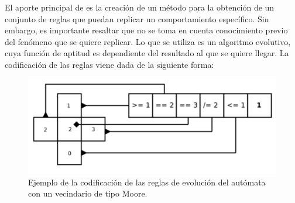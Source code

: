 El aporte principal de \cite{bidlo2016routine} es la creación de un método para la obtención de un conjunto de reglas que puedan replicar un comportamiento específico. Sin embargo, es importante resaltar que no se toma en cuenta conocimiento previo del fenómeno que se quiere replicar. Lo que se utiliza es un algoritmo evolutivo, cuya función de aptitud es dependiente del resultado al que se quiere llegar. La codificación de las reglas viene dada de la siguiente forma:

\begin{figure}[H]
	\centering
	\includegraphics[width=\linewidth]{fig/rulesencoding}
	\caption{Ejemplo de la codificación de las reglas de evolución del autómata con un vecindario de tipo Moore.}
	\label{fig:rulesencoding}
\end{figure}

